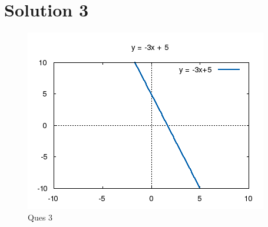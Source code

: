 \documentclass{article}
\begin{document}
\section{Solution 3}

\begin{figure}[!htb]
\centering
\includegraphics{./plots/three.png}
\caption{Ques 3}
\end{figure}
\end{document}
